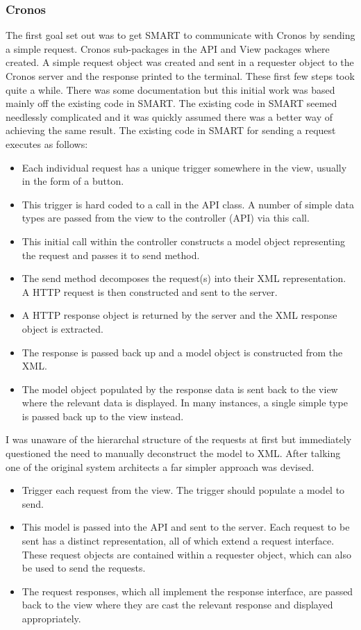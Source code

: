 \documentclass[a4paper, 11pt, titlepage]{article}
\begin{document}
\subsubsection{Cronos}
The first goal set out was to get SMART to communicate with Cronos by sending a simple request. Cronos sub-packages in the API and View packages where created. A simple request object was created and sent in a requester object to the Cronos server and the response printed to the terminal. These first few steps took quite a while. There was some documentation but this initial work was based mainly off the existing code in SMART. The existing code in SMART seemed needlessly complicated and it was quickly assumed there was a better way of achieving the same result. The existing code in SMART for sending a request executes as follows:
\begin{itemize}
\item Each individual request has a unique trigger somewhere in the view, usually in the form of a button.
\item This trigger is hard coded to a call in the API class. A number of simple data types are passed from the view to the controller (API) via this call.
\item This initial call within the controller constructs a model object representing the request and passes it to send method.
\item The send method decomposes the request(s) into their XML representation. A HTTP request is then constructed and sent to the server.
\item A HTTP response object is returned by the server and the XML response object is extracted.
\item The response is passed back up and a model object is constructed from the XML.
\item The model object populated by the response data is sent back to the view where the relevant data is displayed. In many instances, a single simple type is passed back up to the view instead.
\end{itemize}
I was unaware of the hierarchal structure of the requests at first but immediately questioned the need to manually deconstruct the model to XML. After talking one of the original system architects a far simpler approach was devised.
\begin{itemize}
\item Trigger each request from the view. The trigger should populate a model to send. \label{cronos_generic_api}
\item This model is passed into the API and sent to the server. Each request to be sent has a distinct representation, all of which extend a request interface. These request objects are contained within a requester object, which can also be used to send the requests.
\item The request responses, which all implement the response interface, are passed back to the view where they are cast the relevant response and displayed appropriately.
\end{itemize}
\end{document}
